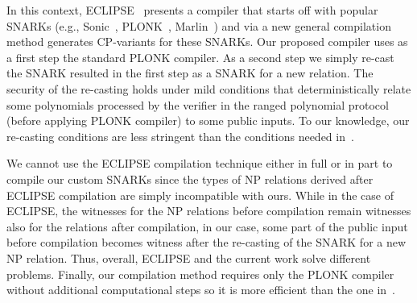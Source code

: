 {\color{red}In this context, ECLIPSE~\cite{eclipse} presents a compiler that starts off with popular SNARKs (e.g., Sonic~\cite{sonic}, PLONK~\cite{plonk}, 
Marlin~\cite{marlin}) and via a new general compilation method generates CP-variants for these SNARKs. 
Our proposed compiler uses as a first step the standard PLONK compiler.  As a second step we simply 
re-cast the SNARK resulted in the first step as a SNARK for a new relation. 
The security of the re-casting holds under mild conditions that deterministically relate some polynomials 
processed by the verifier in the ranged polynomial protocol (before applying PLONK compiler) to some 
public inputs. To our knowledge, our re-casting conditions are less stringent than the conditions needed 
in~\cite{eclipse}.}

We cannot use the ECLIPSE compilation technique either in full or in part to compile our custom SNARKs 
since the types of NP relations derived after ECLIPSE compilation are simply incompatible with ours. While in the 
case of ECLIPSE, the witnesses for the NP relations before compilation remain witnesses also for the relations 
after compilation, in our case, some part of the public input before compilation becomes witness after the 
re-casting of the SNARK for a new NP relation. Thus, overall, ECLIPSE and the current work solve different problems. 
Finally, our compilation method requires only the PLONK compiler without additional computational 
steps so it is more efficient than the one in~\cite{eclipse}.

